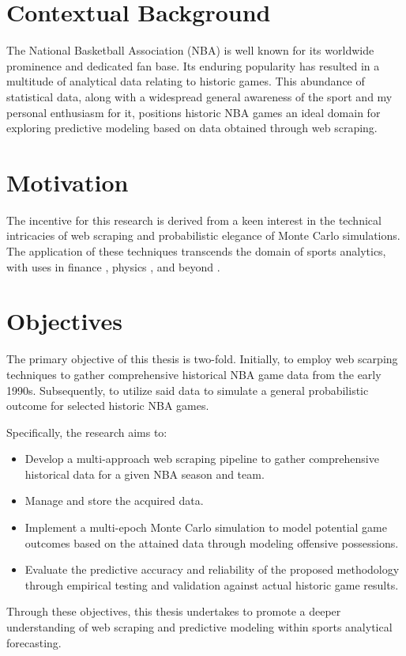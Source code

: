\documentclass{thesis-ekf}
\theoremstyle{definition}
\theoremstyle{remark}
\begin{document}
\section{Contextual Background}
The National Basketball Association (NBA) \cite{NBA} is well known for its worldwide prominence and dedicated fan base. Its enduring popularity has resulted in a multitude of analytical data relating to historic games. This abundance of statistical data, along with a widespread general awareness of the sport and my personal enthusiasm for it, positions historic NBA games an ideal domain for exploring predictive modeling based on data obtained through web scraping.

\section{Motivation}
The incentive for this research is derived from a keen interest in the technical intricacies of web scraping and probabilistic elegance of Monte Carlo simulations. The application of these techniques transcends the domain of sports analytics, with uses in finance \cite{McLeish}, physics \cite{Aderibigbe}, and beyond \cite{Steffen}.

\section{Objectives}
The primary objective of this thesis is two-fold. Initially, to employ web scarping techniques to gather comprehensive historical NBA game data from the early 1990s. Subsequently, to utilize said data to simulate a general probabilistic outcome for selected historic NBA games.

Specifically, the research aims to:
\begin{itemize}
\item Develop a multi-approach web scraping pipeline to gather comprehensive historical data for a given NBA season and team.
\item Manage and store the acquired data.
\item Implement a multi-epoch Monte Carlo simulation to model potential game outcomes based on the attained data through modeling offensive possessions.
\item Evaluate the predictive accuracy and reliability of the proposed methodology through empirical testing and validation against actual historic game results.
\end{itemize}
Through these objectives, this thesis undertakes to promote a deeper understanding of web scraping and predictive modeling within sports analytical forecasting.
\end{document}
